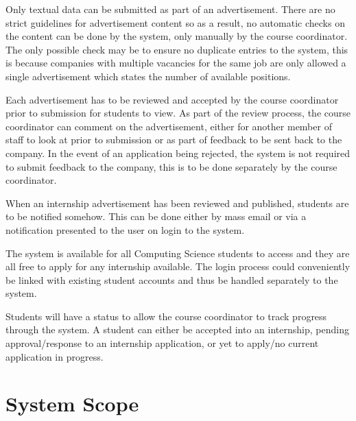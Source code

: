 \documentclass{l3deliverable}
\begin{document}
Only textual data can be submitted as part of an advertisement. There are no
strict guidelines for advertisement content so as a result, no automatic checks
on the content can be done by the system, only manually by the course
coordinator. The only possible check may be to ensure no duplicate entries
to the system, this is because companies with multiple vacancies for the same
job are only allowed a single advertisement which states the number of
available positions.

Each advertisement has to be reviewed and accepted by the course coordinator
prior to submission for students to view. As part of the review process, the
course coordinator can comment on the advertisement, either for another member
of staff to look at prior to submission or as part of feedback to be sent back
to the company. In the event of an application being rejected, the system is
not required to submit feedback to the company, this is to be done separately
by the course coordinator.

When an internship advertisement has been reviewed and published, students 
are to be notified somehow. This can be done either by mass email or via a 
notification presented to the user on login to the system.

The system is available for all Computing Science students to access and 
they are all free to apply for any internship available. The login process could
conveniently be linked with existing student accounts and thus be handled separately
to the system.

Students will have a status to allow the course coordinator to track progress
through the system. A student can either be accepted into an internship, pending
approval/response to an internship application, or yet to apply/no current 
application in progress.


\section{System Scope}


\end{document}
